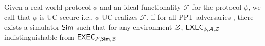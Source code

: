 
\begin{definition} \label{def:uc}
	Given a real world protocol $ \phi $ and an ideal functionality $ \mathcal{F} $ for the protocol $ \phi $, we call that $ \phi $ is UC-secure i.e., $ \phi $ UC-realizes $ \mathcal{F} $, if for all PPT adversaries \adv,  there exists a simulator $ \mathsf{Sim}  $ such that for any environment $ \mathcal{Z} $,
	$\mathsf{EXEC}_{\phi, \mathcal{A}, \mathcal{Z}}$ indistinguishable from $\mathsf{EXEC}_{\mathcal{F},\mathsf{Sim}, \mathcal{Z}}$
\end{definition}





